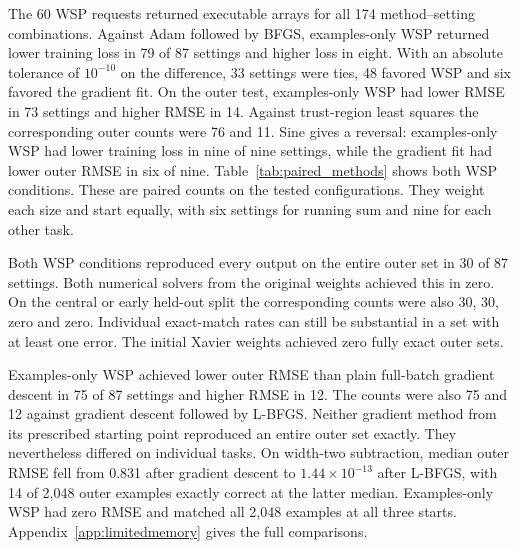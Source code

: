 The 60 WSP requests returned executable arrays for all 174 method--setting combinations. Against Adam followed by BFGS, examples-only WSP returned lower training loss in 79 of 87 settings and higher loss in eight. With an absolute tolerance of $10^{-10}$ on the difference, 33 settings were ties, 48 favored WSP and six favored the gradient fit. On the outer test, examples-only WSP had lower RMSE in 73 settings and higher RMSE in 14. Against trust-region least squares the corresponding outer counts were 76 and 11. Sine gives a reversal: examples-only WSP had lower training loss in nine of nine settings, while the gradient fit had lower outer RMSE in six of nine. Table~\ref{tab:paired_methods} shows both WSP conditions. These are paired counts on the tested configurations. They weight each size and start equally, with six settings for running sum and nine for each other task.

Both WSP conditions reproduced every output on the entire outer set in 30 of 87 settings. Both numerical solvers from the original weights achieved this in zero. On the central or early held-out split the corresponding counts were also 30, 30, zero and zero. Individual exact-match rates can still be substantial in a set with at least one error. The initial Xavier weights achieved zero fully exact outer sets.
    
Examples-only WSP achieved lower outer RMSE than plain full-batch gradient descent in 75 of 87 settings and higher RMSE in 12. The counts were also 75 and 12 against gradient descent followed by L-BFGS. Neither gradient method from its prescribed starting point reproduced an entire outer set exactly. They nevertheless differed on individual tasks. On width-two subtraction, median outer RMSE fell from 0.831 after gradient descent to $1.44\times10^{-13}$ after L-BFGS, with 14 of 2,048 outer examples exactly correct at the latter median. Examples-only WSP had zero RMSE and matched all 2,048 examples at all three starts. Appendix~\ref{app:limitedmemory} gives the full comparisons.
